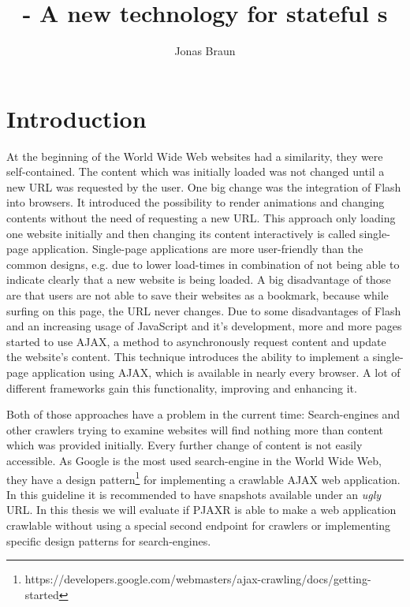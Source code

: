 \documentclass[f,bachelor,binding,twoside,palatino]{WeSTthesis}
\author{Jonas Braun}
\title{\pjaxr{} - A new technology for stateful \singlePageApplication{}s}
\def \ajax {AJAX}
\def \pjaxr {PJAXR}
\def \singlePageApplication {single-page application}
\def \SinglePageApplication {Single-page application}
\begin{document}

\maketitle %

\tableofcontents

\varclearpage




\section{Introduction}
    At the beginning of the World Wide Web websites had a similarity, they were self-contained. The content which was initially loaded was not changed until a new URL was requested by the user.
    One big change was the integration of Flash into browsers. It introduced the possibility to render animations and changing contents without the need of requesting a new URL.
    This approach only loading one website initially and then changing its content interactively is called \singlePageApplication{}.
    \SinglePageApplication{}s are more user-friendly than the common designs, e.g. due to lower load-times in combination of not being able to indicate clearly that a new website is being loaded.
    A big disadvantage of those are that users are not able to save their websites as a bookmark, because while surfing on this page, the URL never changes.
    Due to some disadvantages of Flash and an increasing usage of JavaScript and it's development, more and more pages started to use \ajax{}, a method to asynchronously request content and update the website's content. This technique introduces the ability to implement a \singlePageApplication{} using \ajax{}, which is available in nearly every browser. A lot of different frameworks gain this functionality, improving and enhancing it.

    Both of those approaches have a problem in the current time: Search-engines and other crawlers trying to examine websites will find nothing more than content which was provided initially. Every further change of content is not easily accessible.
    As Google is the most used search-engine in the World Wide Web, they have a design pattern\footnote{https://developers.google.com/webmasters/ajax-crawling/docs/getting-started} for implementing a crawlable \ajax{} web application. In this guideline it is recommended to have snapshots available under an \emph{ugly} URL.
    In this thesis we will evaluate if \pjaxr{} is able to make a web application crawlable without using a special second endpoint for crawlers or implementing specific design patterns for search-engines.
\end{document}
